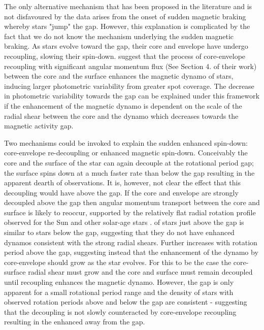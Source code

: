 The only alternative mechanism that has been proposed in the literature and is not disfavoured by the data arises from the onset of sudden magnetic braking whereby stars "jump" the gap.
However, this explanation is complicated by the fact that we do not know the mechanism underlying the sudden magnetic braking.
As stars evolve toward the gap, their core and envelope have undergo recoupling, slowing their spin-down.
\citet{cao_core_2023} suggest that the process of core-envelope recoupling with significant angular momentum flux (See Section 4. of their work) between the core and the surface enhances the magnetic dynamo of stars, inducing larger photometric variability from greater spot coverage.
The decrease in photometric variability towards the gap can be explained under this framework if the enhancement of the magnetic dynamo is dependent on the scale of the radial shear between the core and the dynamo which decreases towards the magnetic activity gap.

Two mechanisms could be invoked to explain the sudden enhanced spin-down: core-envelope re-decoupling or enhanced magnetic spin-down.
Conceivably the core and the surface of the star can again decouple at the rotational period gap; the surface spins down at a much faster rate than below the gap resulting in the apparent dearth of observations.
It is, however, not clear the effect that this decoupling would have above the gap.
If the core and envelope are strongly decoupled above the gap then angular momentum transport between the core and surface is likely to reoccur, supported by the relatively flat radial rotation profile observed for the Sun and other solar-age stars \citep{hall}.
\rper{} of stars just above the gap is similar to stars below the gap, suggesting that they do not have enhanced dynamos consistent with the strong radial shears.
Further \rper{} increases with rotation period above the gap, suggesting instead that the enhancement of the dynamo by core-envelope should grow as the star evolves.
For this to be the case the core-surface radial shear must grow and the core and surface must remain decoupled until recoupling enhances the magnetic dynamo.
However, the gap is only apparent for a small rotational period range and the density of stars with observed rotation periods above and below the gap are consistent - suggesting that the decoupling is not slowly counteracted by core-envelope recoupling resulting in the enhanced \rper{} away from the gap.

